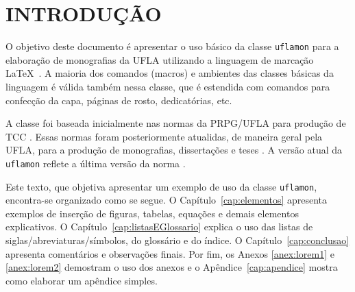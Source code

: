\chapter{INTRODUÇÃO}

O objetivo deste documento é apresentar o uso básico da classe {\tt uflamon} para a elaboração de monografias da UFLA utilizando a linguagem de marcação \LaTeX\ \cite{Lamport1994}.  A maioria dos comandos (macros) e ambientes das classes básicas da linguagem é válida também nessa classe, que é estendida com comandos para confecção da capa, páginas de rosto, dedicatórias, etc.

A classe foi baseada inicialmente nas normas da PRPG/UFLA para produção de TCC \cite{PRPG2006}. Essas normas foram posteriormente atualidas, de maneira geral pela UFLA, para a produção de monografias, dissertações e teses \cite{BIB2010}.  A versão atual da {\tt uflamon} reflete a última versão da norma \cite{UFLA:2015}.

Este texto, que objetiva apresentar um exemplo de uso da classe  {\tt uflamon}, encontra-se organizado como se segue. O Capítulo~\ref{cap:elementos} apresenta exemplos de inserção de figuras, tabelas, equações e demais elementos explicativos. O Capítulo~\ref{cap:listasEGlossario} explica o uso das listas de siglas/abreviaturas/símbolos, do glossário e do índice. O Capítulo~\ref{cap:conclusao} apresenta comentários e observações finais. Por fim, os Anexos \ref{anex:lorem1} e \ref{anex:lorem2} demostram o uso dos anexos e o Apêndice~\ref{cap:apendice} mostra como elaborar um apêndice simples.